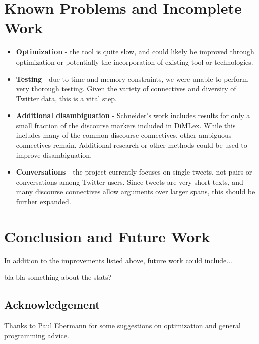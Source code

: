 \documentclass[11pt]{article}
\begin{document}
\section{Known Problems and Incomplete Work}
\begin{itemize}
\item \textbf{Optimization} - the tool is quite slow, and could likely be improved through optimization or potentially the incorporation of existing tool or technologies.
\item \textbf{Testing} - due to time and memory constraints, we were unable to perform very thorough testing.  Given the variety of connectives and diversity of Twitter data, this is a vital step.
\item \textbf{Additional disambiguation} - Schneider's work includes results for only a small fraction of the discourse markers included in DiMLex.  While this includes many of the common discourse connectives, other ambiguous connectives remain.  Additional research or other methods could be used to improve disambiguation.
\item \textbf{Conversations} - the project currently focuses on single tweets, not pairs or conversations among Twitter users.  Since tweets are very short texts, and many discourse connectives allow arguments over larger spans, this should be further expanded.

\end{itemize}

\section{Conclusion and Future Work}

In addition to the improvements listed above, future work could include...

bla bla something about the stats?

\subsection*{Acknowledgement}

Thanks to Paul Ebermann for some suggestions on optimization and general programming advice.
\end{document}
